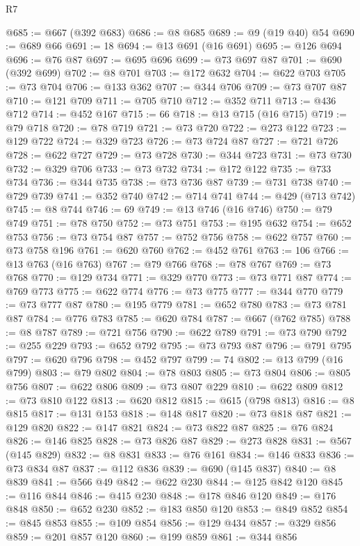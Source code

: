 \begin{lexlean}{R7}
\begin{coremodule}
@685 := @667 (@392 @683)
@686 := @8 @685
@689 := @9 (@19 @40) @54
@690 := @689 @66
@691 := 18
@694 := @13 @691 (@16 @691)
@695 := @126 @694
@696 := @76 @87
@697 := @695 @696
@699 := @73 @697 @87
@701 := @690 (@392 @699)
@702 := @8 @701
@703 := @172 @632
@704 := @622 @703
@705 := @73 @704
@706 := @133 @362
@707 := @344 @706
@709 := @73 @707 @87
@710 := @121 @709
@711 := @705 @710
@712 := @352 @711
@713 := @436 @712
@714 := @452 @167
@715 := 66
@718 := @13 @715 (@16 @715)
@719 := @79 @718
@720 := @78 @719
@721 := @73 @720
@722 := @273 @122
@723 := @129 @722
@724 := @329 @723
@726 := @73 @724 @87
@727 := @721 @726
@728 := @622 @727
@729 := @73 @728
@730 := @344 @723
@731 := @73 @730
@732 := @329 @706
@733 := @73 @732
@734 := @172 @122
@735 := @733 @734
@736 := @344 @735
@738 := @73 @736 @87
@739 := @731 @738
@740 := @729 @739
@741 := @352 @740
@742 := @714 @741
@744 := @429 (@713 @742)
@745 := @8 @744
@746 := 69
@749 := @13 @746 (@16 @746)
@750 := @79 @749
@751 := @78 @750
@752 := @73 @751
@753 := @195 @632
@754 := @652 @753
@756 := @73 @754 @87
@757 := @752 @756
@758 := @622 @757
@760 := @73 @758 @196
@761 := @620 @760
@762 := @452 @761
@763 := 106
@766 := @13 @763 (@16 @763)
@767 := @79 @766
@768 := @78 @767
@769 := @73 @768
@770 := @129 @734
@771 := @329 @770
@773 := @73 @771 @87
@774 := @769 @773
@775 := @622 @774
@776 := @73 @775
@777 := @344 @770
@779 := @73 @777 @87
@780 := @195 @779
@781 := @652 @780
@783 := @73 @781 @87
@784 := @776 @783
@785 := @620 @784
@787 := @667 (@762 @785)
@788 := @8 @787
@789 := @721 @756
@790 := @622 @789
@791 := @73 @790
@792 := @255 @229
@793 := @652 @792
@795 := @73 @793 @87
@796 := @791 @795
@797 := @620 @796
@798 := @452 @797
@799 := 74
@802 := @13 @799 (@16 @799)
@803 := @79 @802
@804 := @78 @803
@805 := @73 @804
@806 := @805 @756
@807 := @622 @806
@809 := @73 @807 @229
@810 := @622 @809
@812 := @73 @810 @122
@813 := @620 @812
@815 := @615 (@798 @813)
@816 := @8 @815
@817 := @131 @153
@818 := @148 @817
@820 := @73 @818 @87
@821 := @129 @820
@822 := @147 @821
@824 := @73 @822 @87
@825 := @76 @824
@826 := @146 @825
@828 := @73 @826 @87
@829 := @273 @828
@831 := @567 (@145 @829)
@832 := @8 @831
@833 := @76 @161
@834 := @146 @833
@836 := @73 @834 @87
@837 := @112 @836
@839 := @690 (@145 @837)
@840 := @8 @839
@841 := @566 @49
@842 := @622 @230
@844 := @125 @842 @120
@845 := @116 @844
@846 := @415 @230
@848 := @178 @846 @120
@849 := @176 @848
@850 := @652 @230
@852 := @183 @850 @120
@853 := @849 @852
@854 := @845 @853
@855 := @109 @854
@856 := @129 @434
@857 := @329 @856
@859 := @201 @857 @120
@860 := @199 @859
@861 := @344 @856

\end{coremodule}
\end{lexlean}
